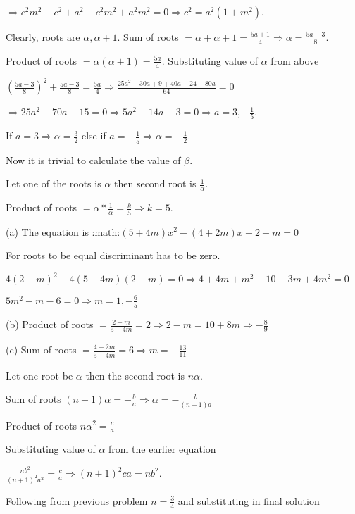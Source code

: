  $\Rightarrow c^2m^2 - c^2 + a^2 - c^2m^2 + a^2m^2 = 0\Rightarrow c^2 = a^2(1 + m^2)$.
\item Clearly, roots are $\alpha, \alpha + 1$. Sum of roots $= \alpha + \alpha + 1 = \frac{5a +
  1}{4}\Rightarrow \alpha = \frac{5a - 3}{8}$.

  Product of roots $= \alpha(\alpha + 1) = \frac{5a}{4}$. Substituting value of $\alpha$ from above

  $\left(\frac{5a - 3}{8}\right)^2 + \frac{5a - 3}{8} = \frac{5a}{4}\Rightarrow \frac{25a^2 - 30a + 9 + 40a
    - 24 - 80a}{64} = 0$

  $\Rightarrow 25a^2 - 70a - 15 = 0 \Rightarrow 5a^2 - 14a - 3 = 0\Rightarrow a = 3, -\frac{1}{5}$.

  If $a = 3 \Rightarrow \alpha = \frac{3}{2}$ else if $a = -\frac{1}{5} \Rightarrow \alpha = -\frac{1}{2}$.

  Now it is trivial to calculate the value of $\beta$.
\item Let one of the roots is $\alpha$ then second root is $\frac{1}{\alpha}$.

  Product of roots $= \alpha * \frac{1}{\alpha} = \frac{k}{5} \Rightarrow k = 5$.
\item (a) The equation is :math:$(5 + 4m)x^2 - (4 + 2m)x + 2 - m = 0$

  For roots to be equal discriminant has to be zero.

  $4(2 + m)^2 - 4(5 + 4m)(2 - m) = 0\Rightarrow 4 + 4m + m^2 - 10 - 3m + 4m^2 = 0$

  $5m^2 - m - 6 = 0 \Rightarrow m = 1, -\frac{6}{5}$

  (b) Product of roots $= \frac{2 - m}{5 + 4m} = 2 \Rightarrow 2 - m = 10 + 8m \Rightarrow -\frac{8}{9}$

  (c) Sum of roots $= \frac{4 + 2m}{5 + 4m} = 6 \Rightarrow m = -\frac{13}{11}$
\item Let one root be $\alpha$ then the second root is $n\alpha$.

  Sum of roots $(n + 1)\alpha = -\frac{b}{a} \Rightarrow \alpha = -\frac{b}{(n + 1)a}$

  Product of roots $n\alpha^2 = \frac{c}{a}$

  Substituting value of $\alpha$ from the earlier equation

  $\frac{nb^2}{(n + 1)^2a^2} = \frac{c}{a} \Rightarrow (n + 1)^2 ca = nb^2$.
\item Following from previous problem $n = \frac{3}{4}$ and substituting in final solution

